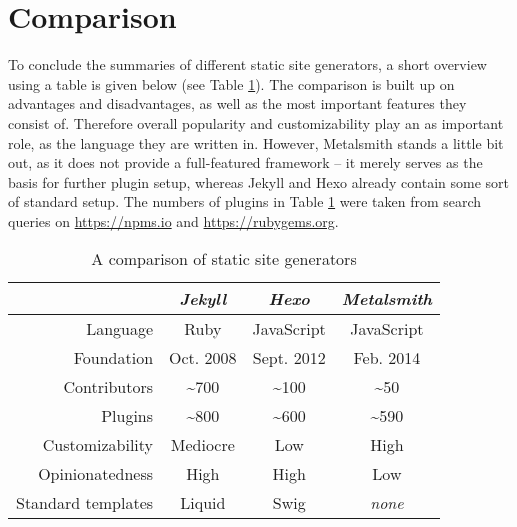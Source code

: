 \section{Comparison}
\label{sec:comparison}

To conclude the summaries of different static site generators, a short overview using a table is given below (see Table \ref{table:comparison}). The comparison is built up on advantages and disadvantages, as well as the most important features they consist of. Therefore overall popularity and customizability play an as important role, as the language they are written in. However, Metalsmith stands a little bit out, as it does not provide a full-featured framework -- it merely serves as the basis for further plugin setup, whereas Jekyll and Hexo already contain some sort of standard setup.
The numbers of plugins in Table \ref{table:comparison} were taken from search queries on \url{https://npms.io} and \url{https://rubygems.org}.

\begin{table}
  \caption{A comparison of static site generators}
  \label{table:comparison}
  \centering
  \setlength{\tabcolsep}{5mm}
  \def\arraystretch{1.25}
  \begin{tabular}{|r||c|c|c|}
    \hline
    & \emph{Jekyll} & \emph{Hexo} & \emph{Metalsmith} \\
    \hline
    \hline
    Language & Ruby & JavaScript & JavaScript \\
    \hline
    Foundation & Oct. 2008 & Sept. 2012 & Feb. 2014 \\
    \hline
    Contributors & \textasciitilde 700 & \textasciitilde 100 & \textasciitilde 50 \\
    \hline
    Plugins & \textasciitilde 800 & \textasciitilde 600 & \textasciitilde 590 \\
    \hline
    Customizability & Mediocre & Low & High \\
    \hline
    Opinionatedness & High & High & Low \\
    \hline
    Standard templates & Liquid & Swig & \emph{none} \\
    \hline
  \end{tabular}

\end{table}
